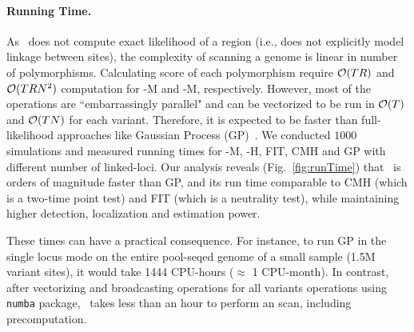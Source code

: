 \paragraph{Running Time.}
As \comale\ does not compute exact likelihood of a region (i.e., does not 
explicitly model linkage between sites), the complexity of scanning a genome is 
linear in number of polymorphisms.
Calculating score of each polymorphism require
${\cal O}(TR)$ and ${\cal O}(TRN^2)$ computation for \comale-M and \comale-M, 
respectively. However, most of the operations are ``embarrassingly parallel" 
and can be vectorized to be run in ${\cal O}(T)$ and ${\cal O}(TN)$ for each variant.
Therefore, it is expected to be faster than full-likelihood
approaches like Gaussian Process (GP)~\cite{Terhorst2015Multi}. We
conducted $1000$ simulations and measured running times for \comale-M, 
\comale-H, FIT, CMH and GP with different number of linked-loci. 
Our analysis reveals (Fig.~\ref{fig:runTime}) that \comale\ is orders of 
magnitude faster than GP, and its run time comparable to CMH (which is a 
two-time point test) and FIT (which is a neutrality test), while maintaining 
higher detection, localization and estimation power. 

These times can have a practical consequence. For instance, to run GP in the 
single locus mode on
the entire pool-seqed \dmel genome of a small sample (1.5M variant
sites), it would take 1444 CPU-hours ($\approx$ 1 CPU-month). In
contrast, after vectorizing and broadcasting operations for all variants 
operations using \texttt{numba} package, \comale\ takes less than an hour to 
perform an scan, including precomputation.


